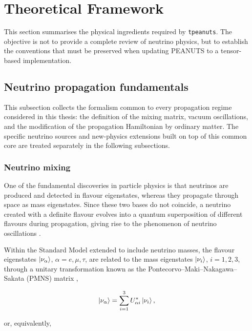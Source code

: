 \section{Theoretical Framework}

This section summarises the physical ingredients required by \texttt{tpeanuts}. The objective is not to provide a complete review of neutrino physics, but to establish the conventions that must be preserved when updating PEANUTS to a tensor-based implementation.

\subsection{Neutrino propagation fundamentals}
\label{sec:propagation-fundamentals}

This subsection collects the formalism common to every propagation regime considered in this thesis: the definition of the mixing matrix, vacuum oscillations, and the modification of the propagation Hamiltonian by ordinary matter. The specific neutrino sources and new-physics extensions built on top of this common core are treated separately in the following subsections.

\subsubsection{Neutrino mixing}

One of the fundamental discoveries in particle physics is that neutrinos are produced and detected in flavour eigenstates, whereas they propagate through space as mass eigenstates. Since these two bases do not coincide, a neutrino created with a definite flavour evolves into a quantum superposition of different flavours during propagation, giving rise to the phenomenon of neutrino oscillations \parencite{Giunti2007}.

Within the Standard Model extended to include neutrino masses, the flavour eigenstates \(\left|\nu_\alpha\right\rangle\), \(\alpha=e,\mu,\tau\), are related to the mass eigenstates \(\left|\nu_i\right\rangle\), \(i=1,2,3\), through a unitary transformation known as the Pontecorvo--Maki--Nakagawa--Sakata (PMNS) matrix \parencite{Pontecorvo1957,Pontecorvo1958,MakiNakagawaSakata1962},

\begin{equation}
  \left|\nu_\alpha\right\rangle = \sum_{i=1}^{3} U_{\alpha i}^{*}\left|\nu_i\right\rangle,
\end{equation}

or, equivalently,


